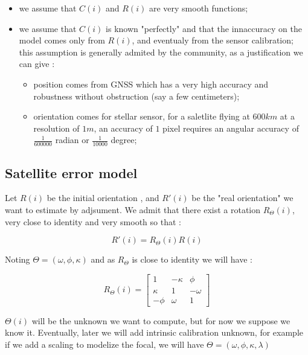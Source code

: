 \begin{itemize}
    \item we assume that $C(i)$  and $R(i)$  are very smooth functions;
    \item we assume that $C(i)$  is known  "perfectly" and that the innaccuracy
          on the model comes only from $R(i)$, and eventualy from the sensor calibration;  this assumption is generally admited
          by the community, as a justification we can give :
    \begin{itemize}
         \item  position comes from GNSS which has a very high accuracy and robustness without obstruction (say a few centimeters);
         \item  orientation comes for stellar sensor, for a saletlite flying at $600km$ at a resolution of $1m$,
                an accuracy of $1$ pixel requires an angular accuracy of $\frac{1}{600000}$ radian or $\frac{1}{10000}$ degree;
     \end{itemize}
\end{itemize}


\subsection{Satellite error model}

Let $R(i)$ be the initial orientation , and $R'(i)$ be the "real orientation"
we want to estimate by adjsument.
We admit that there exist a rotation $R_\Theta(i)$, very close to identity and
very smooth so that :

\begin{equation}
    R'(i) = R_\Theta(i) R(i)
\end{equation}

Noting $\Theta=(\omega,\phi,\kappa)$ and as  $R_\Theta$ is close to identity we will have :

%
%
%

\begin{equation}
    R_\Theta(i) = 
\begin{bmatrix}
1 &  - \kappa & \phi\\
\kappa & 1 & -\omega\\
-\phi & \omega & 1
\end{bmatrix} 	
\end{equation}


$\Theta(i)$ will be the unknown we want to compute, but for now
we suppose we know it.  Eventually, later we will add intrinsic calibration
unknown, for example if we add a scaling to modelize the focal, we will 
have $\Theta=(\omega,\phi,\kappa, \lambda)$

